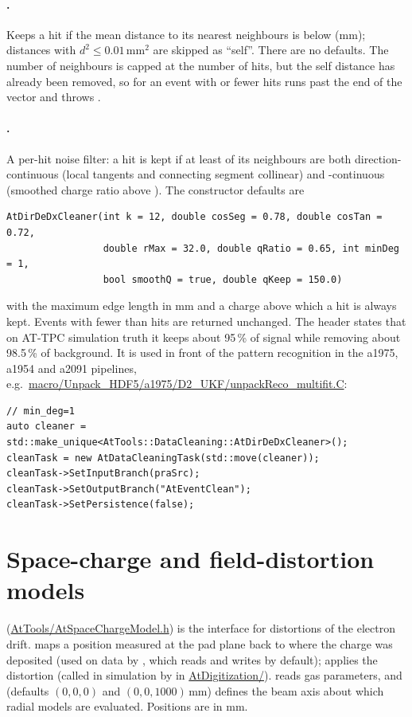 \paragraph{.}
Keeps a hit if the mean distance to its  nearest neighbours is below  (mm); distances with
$d^2 \le 0.01$\,mm$^2$ are skipped as ``self''. There are no defaults. The number of neighbours is capped at the
number of hits, but the self distance has already been removed, so for an event with  or fewer hits
 runs past the end of the vector and throws .

\paragraph{.}
A per-hit noise filter: a hit is kept if at least  of its neighbours are both direction-continuous (local
tangents and connecting segment collinear) and \dedx{}-continuous (smoothed charge ratio above ). The
constructor defaults are
\begin{verbatim}
AtDirDeDxCleaner(int k = 12, double cosSeg = 0.78, double cosTan = 0.72,
                 double rMax = 32.0, double qRatio = 0.65, int minDeg = 1,
                 bool smoothQ = true, double qKeep = 150.0)
\end{verbatim}
with  the maximum edge length in mm and  a charge above which a hit is always kept. Events with
fewer than  hits are returned unchanged. The header states that on AT-TPC simulation truth it keeps about
95\,\% of signal while removing about 98.5\,\% of background. It is used in front of the pattern recognition in the
a1975, a1954 and a2091 pipelines, e.g.\ \url{macro/Unpack_HDF5/a1975/D2_UKF/unpackReco_multifit.C}:
\begin{verbatim}
// min_deg=1
auto cleaner = std::make_unique<AtTools::DataCleaning::AtDirDeDxCleaner>();
cleanTask = new AtDataCleaningTask(std::move(cleaner));
cleanTask->SetInputBranch(praSrc);
cleanTask->SetOutputBranch("AtEventClean");
cleanTask->SetPersistence(false);
\end{verbatim}

\section{Space-charge and field-distortion models}

 (\url{AtTools/AtSpaceChargeModel.h}) is the interface for distortions of the electron
drift.  maps a position measured at the pad plane back to where the charge was deposited
(used on data by , which reads  and writes 
by default);  applies the distortion (called in simulation by  in
\url{AtDigitization/}).  reads gas parameters, and
 (defaults $(0,0,0)$ and $(0,0,1000)$\,mm) defines the beam axis about which
radial models are evaluated. Positions are in mm.

